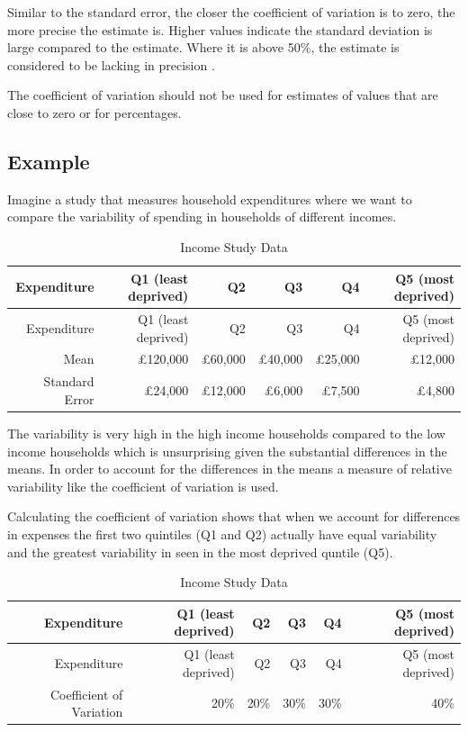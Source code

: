 \documentclass[
]{book}
\begin{document}
Similar to the standard error, the closer the coefficient of variation is to zero, the more precise the estimate is. Higher values indicate the standard deviation is large compared to the estimate. Where it is above 50\%, the estimate is considered to be lacking in precision \citep{uncertainty}.

The coefficient of variation should not be used for estimates of values that are close to zero or for percentages.

\hypertarget{example}{%
\subsection{Example}\label{example}}

Imagine a study that measures household expenditures where we want to compare the variability of spending in households of different incomes.

\begin{longtable}[]{@{}rrrrrr@{}}
\caption{\label{tab:table0000} Income Study Data}\tabularnewline
\toprule
Expenditure & Q1 (least deprived) & Q2 & Q3 & Q4 & Q5 (most deprived) \\
\midrule
\endfirsthead
\toprule
Expenditure & Q1 (least deprived) & Q2 & Q3 & Q4 & Q5 (most deprived) \\
\midrule
\endhead
Mean & £120,000 & £60,000 & £40,000 & £25,000 & £12,000 \\
Standard Error & £24,000 & £12,000 & £6,000 & £7,500 & £4,800 \\
\bottomrule
\end{longtable}

The variability is very high in the high income households compared to the low income households which is unsurprising given the substantial differences in the means. In order to account for the differences in the means a measure of relative variability like the coefficient of variation is used.

Calculating the coefficient of variation shows that when we account for differences in expenses the first two quintiles (Q1 and Q2) actually have equal variability and the greatest variability in seen in the most deprived quntile (Q5).

\begin{longtable}[]{@{}rrrrrr@{}}
\caption{\label{tab:table00000} Income Study Data}\tabularnewline
\toprule
Expenditure & Q1 (least deprived) & Q2 & Q3 & Q4 & Q5 (most deprived) \\
\midrule
\endfirsthead
\toprule
Expenditure & Q1 (least deprived) & Q2 & Q3 & Q4 & Q5 (most deprived) \\
\midrule
\endhead
Coefficient of Variation & 20\% & 20\% & 30\% & 30\% & 40\% \\
\bottomrule
\end{longtable}
\end{document}
